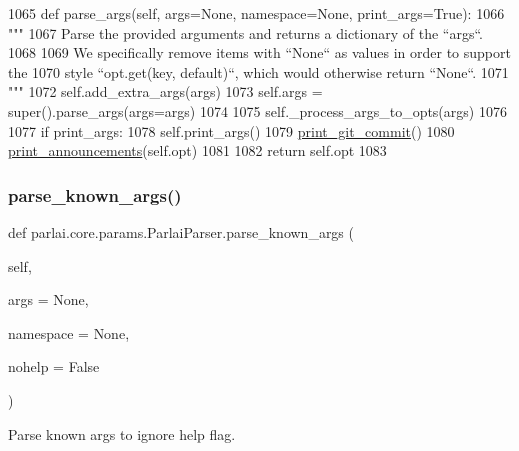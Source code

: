 \begin{DoxyCode}
1065     \textcolor{keyword}{def }parse\_args(self, args=None, namespace=None, print\_args=True):
1066         \textcolor{stringliteral}{"""}
1067 \textcolor{stringliteral}{        Parse the provided arguments and returns a dictionary of the ``args``.}
1068 \textcolor{stringliteral}{}
1069 \textcolor{stringliteral}{        We specifically remove items with ``None`` as values in order to support the}
1070 \textcolor{stringliteral}{        style ``opt.get(key, default)``, which would otherwise return ``None``.}
1071 \textcolor{stringliteral}{        """}
1072         self.add\_extra\_args(args)
1073         self.args = super().parse\_args(args=args)
1074 
1075         self.\_process\_args\_to\_opts(args)
1076 
1077         \textcolor{keywordflow}{if} print\_args:
1078             self.print\_args()
1079             \hyperlink{namespaceparlai_1_1core_1_1params_ac8624bf16ab6b2df0f2869f29a92c90b}{print\_git\_commit}()
1080             \hyperlink{namespaceparlai_1_1core_1_1params_afd1a47c94990168ea9e70d894a79bd2c}{print\_announcements}(self.opt)
1081 
1082         \textcolor{keywordflow}{return} self.opt
1083 
\end{DoxyCode}
\mbox{\label{classparlai_1_1core_1_1params_1_1ParlaiParser_a2a98c07f7393108ad67773951038f191}} 
\subsubsection{\texorpdfstring{parse\+\_\+known\+\_\+args()}{parse\_known\_args()}}
{\footnotesize\ttfamily def parlai.\+core.\+params.\+Parlai\+Parser.\+parse\+\_\+known\+\_\+args (\begin{DoxyParamCaption}\item[{}]{self,  }\item[{}]{args = {\ttfamily None},  }\item[{}]{namespace = {\ttfamily None},  }\item[{}]{nohelp = {\ttfamily False} }\end{DoxyParamCaption})}

\begin{DoxyVerb}Parse known args to ignore help flag.
\end{DoxyVerb}
 


